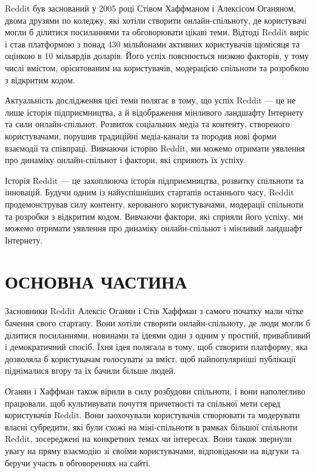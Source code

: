 \documentclass[oneside,14pt]{extarticle}
\begin{document}
Reddit був заснований у 2005 році Стівом Хаффманом і Алексісом Оганяном, двома друзями по коледжу, які хотіли створити онлайн-спільноту, де користувачі могли б ділитися посиланнями та обговорювати цікаві теми. Відтоді Reddit виріс і став платформою з понад 430 мільйонами активних користувачів щомісяця та оцінкою в 10 мільярдів доларів. Його успіх пояснюється низкою факторів, у тому числі вмістом, орієнтованим на користувачів, модерацією спільноти та розробкою з відкритим кодом.

Актуальність дослідження цієї теми полягає в тому, що успіх Reddit — це не лише історія підприємництва, а й відображення мінливого ландшафту Інтернету та сили онлайн-спільнот. Розвиток соціальних медіа та контенту, створеного користувачами, порушив традиційні медіа-канали та породив нові форми взаємодії та співпраці. Вивчаючи історію Reddit, ми можемо отримати уявлення про динаміку онлайн-спільнот і фактори, які сприяють їх успіху.

Історія Reddit — це захоплююча історія підприємництва, розвитку спільноти та інновацій. Будучи одним із найуспішніших стартапів останнього часу, Reddit продемонстрував силу контенту, керованого користувачами, модерації спільноти та розробки з відкритим кодом. Вивчаючи фактори, які сприяли його успіху, ми можемо отримати уявлення про динаміку онлайн-спільнот і мінливий ландшафт Інтернету.

\section*{ОСНОВНА ЧАСТИНА}

Засновники Reddit Алексіс Оганян і Стів Хаффман з самого початку мали чітке бачення свого стартапу. Вони хотіли створити онлайн-спільноту, де люди могли б ділитися посиланнями, новинами та ідеями один з одним у простий, привабливий і демократичний спосіб. Їхня ідея полягала в тому, щоб створити платформу, яка дозволяла б користувачам голосувати за вміст, щоб найпопулярніші публікації піднімалися вгору та їх бачили більше людей.

Оганян і Хаффман також вірили в силу розбудови спільноти, і вони наполегливо працювали, щоб культивувати почуття причетності та спільної мети серед користувачів Reddit. Вони заохочували користувачів створювати та модерувати власні субредити, які були схожі на міні-спільноти в рамках більшої спільноти Reddit, зосереджені на конкретних темах чи інтересах. Вони також звернули увагу на пряму взаємодію зі своїми користувачами, відповідаючи на відгуки та беручи участь в обговореннях на сайті.
\end{document}
